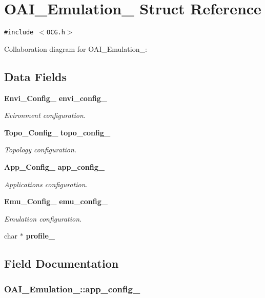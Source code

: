 \section{OAI\_\-Emulation\_\- Struct Reference}
\label{structOAI__Emulation__}
{\tt \#include $<$OCG.h$>$}

Collaboration diagram for OAI\_\-Emulation\_\-:\subsection*{Data Fields}
\begin{CompactItemize}
\item 
{\bf Envi\_\-Config\_\-} {\bf envi\_\-config\_\-}
\begin{CompactList}\small\item\em Evironment configuration. \item\end{CompactList}\item 
{\bf Topo\_\-Config\_\-} {\bf topo\_\-config\_\-}
\begin{CompactList}\small\item\em Topology configuration. \item\end{CompactList}\item 
{\bf App\_\-Config\_\-} {\bf app\_\-config\_\-}
\begin{CompactList}\small\item\em Applications configuration. \item\end{CompactList}\item 
{\bf Emu\_\-Config\_\-} {\bf emu\_\-config\_\-}
\begin{CompactList}\small\item\em Emulation configuration. \item\end{CompactList}\item 
char $\ast$ {\bf profile\_\-}
\end{CompactItemize}


\subsection{Field Documentation}
\subsubsection[{app\_\-config\_\-}]{ {\bf OAI\_\-Emulation\_\-::app\_\-config\_\-}}\label{structOAI__Emulation___239bf4462bc3e9e4c94ca2c2065e96bf}


